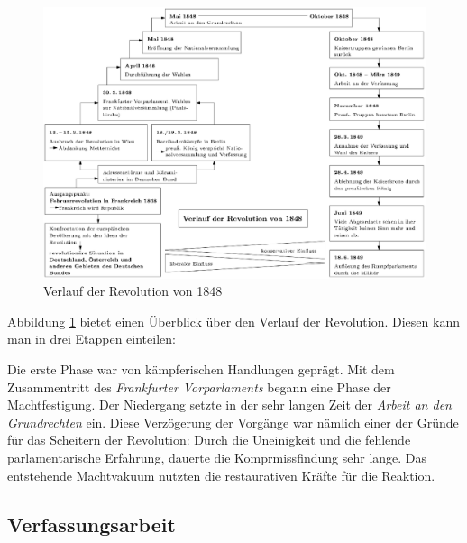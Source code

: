 \begin{figure}
\includegraphics[height=\textwidth, angle=90]{verlauf-rev.eps}
\caption{Verlauf der Revolution von 1848}
\label{pic:verlauf-rev}
\end{figure}

Abbildung \ref{pic:verlauf-rev} bietet einen Überblick über den
Verlauf der Revolution. Diesen kann man in drei Etappen einteilen:

Die erste Phase war von kämpferischen Handlungen geprägt. Mit dem
Zusammentritt des \emph{Frankfurter Vorparlaments}
 begann eine Phase der Machtfestigung.
Der Niedergang setzte in der sehr langen Zeit der \emph{Arbeit an den
Grundrechten} ein. Diese Verzögerung der Vorgänge war nämlich einer
der Gründe für das Scheitern der Revolution: Durch die Uneinigkeit und
die fehlende parlamentarische Erfahrung, dauerte die Komprmissfindung
sehr lange. Das entstehende Machtvakuum nutzten die restaurativen
Kräfte für die Reaktion.


\subsection{Verfassungsarbeit}

